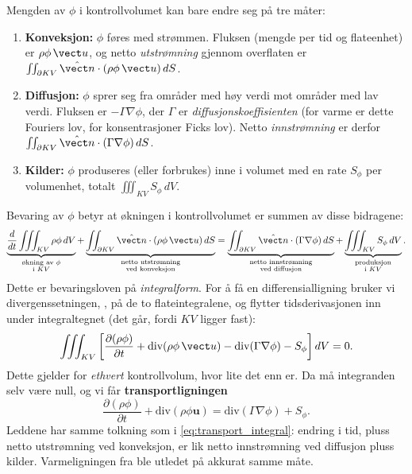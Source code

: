 Mengden av $\phi$ i kontrollvolumet kan bare endre seg på tre måter:
\begin{enumerate}
\item \textbf{Konveksjon:} $\phi$ føres med strømmen. Fluksen (mengde per tid og flateenhet) er $\rho\phi\,\vect u$, og netto \emph{utstrømning} gjennom overflaten er $\iint_{\partial KV}\hat{\vect n}\cdot(\rho\phi\,\vect u)\,dS$.
\item \textbf{Diffusjon:} $\phi$ sprer seg fra områder med høy verdi mot områder med lav verdi. Fluksen er $-\Gamma\nabla\phi$, der $\Gamma$ er \emph{diffusjonskoeffisienten} (for varme er dette Fouriers lov, for konsentrasjoner Ficks lov). Netto \emph{innstrømning} er derfor $\iint_{\partial KV}\hat{\vect n}\cdot(\Gamma\nabla\phi)\,dS$.
\item \textbf{Kilder:} $\phi$ produseres (eller forbrukes) inne i volumet med en rate $S_\phi$ per volumenhet, totalt $\iiint_{KV}S_\phi\,dV$.
\end{enumerate}
Bevaring av $\phi$ betyr at økningen i kontrollvolumet er summen av disse bidragene:
\begin{equation}\label{eq:transport_integral}
\underbrace{\frac{d}{dt}\iiint_{KV}\rho\phi\,dV}_{\substack{\text{økning av $\phi$}\\ \text{i } KV}}
+ \underbrace{\iint_{\partial KV}\hat{\vect n}\cdot(\rho\phi\,\vect u)\,dS}_{\substack{\text{netto utstrømning}\\ \text{ved konveksjon}}}
= \underbrace{\iint_{\partial KV}\hat{\vect n}\cdot(\Gamma\nabla\phi)\,dS}_{\substack{\text{netto innstrømning}\\ \text{ved diffusjon}}}
+ \underbrace{\iiint_{KV}S_\phi\,dV}_{\substack{\text{produksjon}\\ \text{i } KV}} .
\end{equation}
Dette er bevaringsloven på \emph{integralform}. For å få en differensialligning bruker vi divergenssetningen, , på de to flateintegralene, og flytter tidsderivasjonen inn under integraltegnet (det går, fordi $KV$ ligger fast):
\[
\iiint_{KV}\left[\frac{\partial(\rho\phi)}{\partial t} + \text{div}(\rho\phi\,\vect u) - \text{div}(\Gamma\nabla\phi) - S_\phi\right]dV = 0 .
\]
Dette gjelder for \emph{ethvert} kontrollvolum, hvor lite det enn er. Da må integranden selv være null, og vi får \textbf{transportligningen}
\begin{equation}\label{eq:transportphi}
\frac{\partial (\rho \phi)}{\partial t} + \text{div}(\rho \phi \mathbf{u}) = \text{div}(\Gamma \nabla \phi) + S_{\phi}.
\end{equation}
Leddene har samme tolkning som i \eqref{eq:transport_integral}: endring i tid, pluss netto utstrømning ved konveksjon, er lik netto innstrømning ved diffusjon pluss kilder. Varmeligningen fra  ble utledet på akkurat samme måte.


